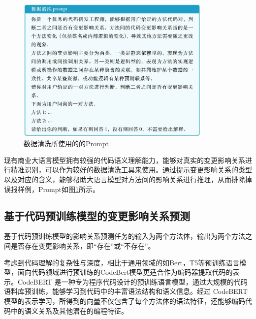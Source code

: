 \begin{figure}[htbp]
\centering
\includegraphics[width = 0.85\textwidth]{figures/1_数据清洗.png}
\caption{数据清洗所使用的的Prompt}
\label{1_数据清洗}
\end{figure}


现有商业大语言模型拥有较强的代码语义理解能力，能够对真实的变更影响关系进行精准识别，可以作为较好的数据清洗工具来使用。通过提示变更影响关系的类型以及对应的含义，能够帮助大语言模型对方法间的影响关系进行推理，从而排除掉误报样例，Prompt如图\ref{1_数据清洗}所示。


\subsection{基于代码预训练模型的变更影响关系预测}

基于代码预训练模型的影响关系预测任务的输入为两个方法体，输出为两个方法之间是否存在变更影响关系，即“存在”或“不存在”。

考虑到代码理解的复杂性与深度，相比于通用领域的如Bert，T5等预训练语言模型，面向代码领域进行预训练的CodeBert模型更适合作为编码器提取代码的表示。CodeBERT 是一种专为程序代码设计的预训练语言模型，通过大规模的代码语料库预训练，能够学习到代码中的丰富语法结构和语义信息。经过 CodeBERT 模型的表示学习，所得到的向量不仅包含了每个方法体的语法特征，还能够编码代码中的语义关系及其他潜在的编程特征。

